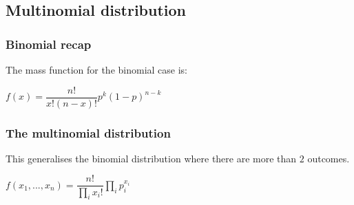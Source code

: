 
\subsection{Multinomial distribution}

\subsubsection{Binomial recap}

The mass function for the binomial case is:

\(f(x)=\dfrac{n!}{x!(n-x)!}p^k(1-p)^{n-k}\)

\subsubsection{The multinomial distribution}

This generalises the binomial distribution where there are more than \(2\) outcomes.

\(f(x_1,...,x_n)=\dfrac{n!}{\prod_i x_i!}\prod_i p_i^{x_i}\)

